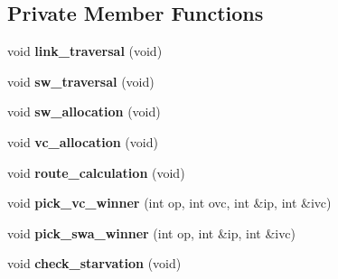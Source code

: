 \subsection*{Private Member Functions}
\begin{DoxyCompactItemize}
\item 
\hypertarget{classrouter__c_a994a53278ee457db9f06300642fea625}{
void {\bfseries link\_\-traversal} (void)}
\label{classrouter__c_a994a53278ee457db9f06300642fea625}

\item 
\hypertarget{classrouter__c_a0963bcf7b8401dd8f243cbb7aa735038}{
void {\bfseries sw\_\-traversal} (void)}
\label{classrouter__c_a0963bcf7b8401dd8f243cbb7aa735038}

\item 
\hypertarget{classrouter__c_a91d1b20996e6660795d49464362267fc}{
void {\bfseries sw\_\-allocation} (void)}
\label{classrouter__c_a91d1b20996e6660795d49464362267fc}

\item 
\hypertarget{classrouter__c_aaf3de2a5121fc1f21fe77632802f29b4}{
void {\bfseries vc\_\-allocation} (void)}
\label{classrouter__c_aaf3de2a5121fc1f21fe77632802f29b4}

\item 
\hypertarget{classrouter__c_ae1bbda11d393a9d5fa373b60f4cb0d5d}{
void {\bfseries route\_\-calculation} (void)}
\label{classrouter__c_ae1bbda11d393a9d5fa373b60f4cb0d5d}

\item 
\hypertarget{classrouter__c_a1febcbcd5b95c1a237d3a5764b146b74}{
void {\bfseries pick\_\-vc\_\-winner} (int op, int ovc, int \&ip, int \&ivc)}
\label{classrouter__c_a1febcbcd5b95c1a237d3a5764b146b74}

\item 
\hypertarget{classrouter__c_a29f588605f4a1cc8bf03cfc445a4f77b}{
void {\bfseries pick\_\-swa\_\-winner} (int op, int \&ip, int \&ivc)}
\label{classrouter__c_a29f588605f4a1cc8bf03cfc445a4f77b}

\item 
\hypertarget{classrouter__c_aeaa5d4405d2ce331148e0578dc38d827}{
void {\bfseries check\_\-starvation} (void)}
\label{classrouter__c_aeaa5d4405d2ce331148e0578dc38d827}

\end{DoxyCompactItemize}
